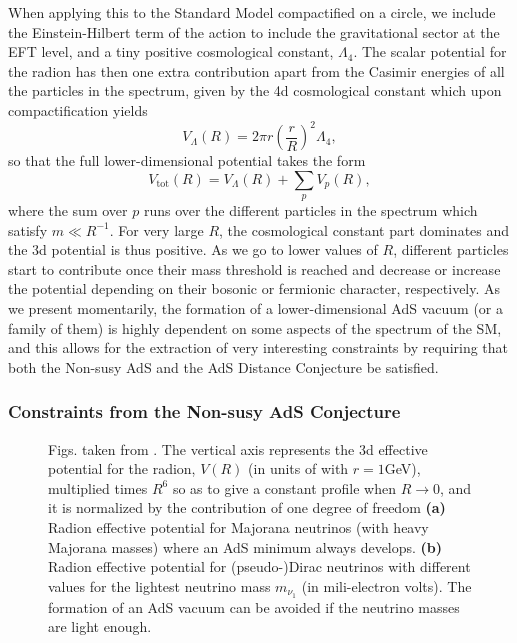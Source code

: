 \documentclass[11pt,a4paper]{article}
\begin{document}
When applying this to the Standard Model compactified on a circle, we include the Einstein-Hilbert term of the action to include the gravitational sector at the EFT level, and a tiny positive cosmological constant, $\Lambda_4$. The scalar potential for the radion has then one extra contribution apart from the Casimir energies of all the particles in the spectrum, given by the 4d cosmological constant which upon compactification yields 
\begin{equation}
\label{eq:Lambdapotential}
V_{\Lambda} (R)=2 \pi r \left( \dfrac{r }{R}\right)^2 \Lambda_4,
\end{equation}
so that the full lower-dimensional potential takes the form
\begin{equation}
V_{\mathrm{tot}}(R)=V_{\Lambda}(R)+\sum_p V_p(R),
\end{equation}
where the sum over $p$ runs over the different particles in the spectrum which satisfy  \mbox{$m\ll R^{-1}$}. For very large $R$, the cosmological constant part dominates and the 3d potential is thus positive. As we go to lower values of $R$, different particles start to contribute once their mass threshold is reached and decrease or increase the potential depending on their bosonic or fermionic character, respectively. As we present momentarily, the formation of a lower-dimensional AdS vacuum (or a family of them) is highly dependent on some aspects of the spectrum of the SM, and this allows for the extraction of very interesting constraints by requiring that both the Non-susy AdS and the AdS Distance Conjecture be satisfied.

\subsubsection*{Constraints from the Non-susy AdS Conjecture}

\begin{figure}[t]
     \begin{center}
      \caption{\footnotesize  Figs. taken from \cite{Gonzalo:2018tpb}. The vertical axis represents the 3d effective potential for the radion, $V(R)$ (in units of with $r=1$GeV), multiplied times $R^6$ so as to give a constant profile when $R\rightarrow 0$, and it is normalized by the contribution of one degree of freedom \textbf{(a)} Radion effective potential for Majorana neutrinos (with heavy Majorana masses) where an AdS minimum always develops. \textbf{(b)} Radion effective potential for \mbox{(pseudo-)Dirac} neutrinos with different values for the lightest neutrino mass $m_{\nu_1}$ (in mili-electron volts). The formation of an AdS vacuum can be avoided if the neutrino masses are light enough. }
      \label{fig:neutrinovacua}
      \end{center}
      \end{figure}
\end{document}

